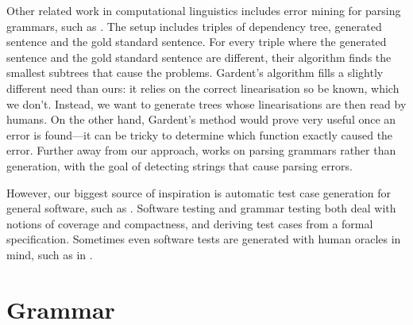 Other related work in computational linguistics includes error mining
for parsing grammars, such as \citet{gardent2012errormining}. The
setup includes triples of dependency tree, generated sentence and the
gold standard sentence. For every triple where the generated sentence
and the gold standard sentence are different, their algorithm finds
the smallest subtrees that cause the problems. Gardent's algorithm
fills a slightly different need than ours: it relies on the correct
linearisation so be known, which we don't. Instead, we want to
generate trees whose linearisations are then read by humans. On the
other hand, Gardent's method would prove very useful once an error is
found---it can be tricky to determine which function exactly caused
the error.  Further away from our approach, \citet{vanNoord2004} works
on parsing grammars rather than generation, with the goal of detecting
strings that cause parsing errors.

However, our biggest source of inspiration is automatic test case
generation for general software, such as
\citet{celentano1980compiler,Geist1996,QuickCheck}. Software testing and
grammar testing both deal with notions of coverage and compactness,
and deriving test cases from a formal specification. Sometimes even
software tests are generated with human oracles in mind, such as in
\citet{Matinnejad2016automated_testsuite_simulink}.


\section{Grammar}


